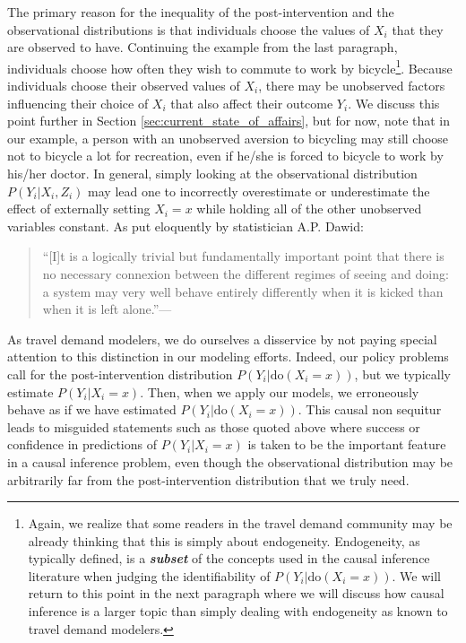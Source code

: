 The primary reason for the inequality of the post-intervention and the observational distributions is that individuals choose the values of $X_i$ that they are observed to have. Continuing the example from the last paragraph, individuals choose how often they wish to commute to work by bicycle\footnote{Again, we realize that some readers in the travel demand community may be already thinking that this is simply about endogeneity. Endogeneity, as typically defined, is a \textit{\textbf{subset}} of the concepts used in the causal inference literature when judging the identifiability of $P \left( Y_i | \textrm{do} \left( X_i = x \right) \right)$. We will return to this point in the next paragraph where we will discuss how causal inference is a larger topic than simply dealing with endogeneity as known to travel demand modelers.}. Because individuals choose their observed values of $X_i$, there may be unobserved factors influencing their choice of $X_i$ that also affect their outcome $Y_i$. We discuss this point further in Section \ref{sec:current_state_of_affairs}, but for now, note that in our example, a person with an unobserved aversion to bicycling may still choose not to bicycle a lot for recreation, even if he/she is forced to bicycle to work by his/her doctor. In general, simply looking at the observational distribution $P \left( Y_i | X_i, Z_i \right)$ may lead one to incorrectly overestimate or underestimate the effect of externally setting $X_i = x$ while holding all of the other unobserved variables constant. As put eloquently by statistician A.P. Dawid:
\begin{quotation}
``[I]t is a logically trivial but fundamentally important point that there is no necessary connexion between the different regimes of seeing and doing: a system may very well behave entirely differently when it is kicked than when it is left alone.''---\citep{dawid_2010_beware}
\end{quotation}
As travel demand modelers, we do ourselves a disservice by not paying special attention to this distinction in our modeling efforts. Indeed, our policy problems call for the post-intervention distribution $P \left( Y_i | \textrm{do} \left( X_i = x \right) \right)$, but we typically estimate $P \left( Y_i | X_i = x \right)$. Then, when we apply our models, we erroneously behave as if we have estimated $P \left( Y_i | \textrm{do} \left( X_i = x \right) \right)$. This causal non sequitur leads to misguided statements such as those quoted above where success or confidence in predictions of $P \left( Y_i | X_i = x \right)$ is taken to be the important feature in a causal inference problem, even though the observational distribution may be arbitrarily far from the post-intervention distribution that we truly need.

